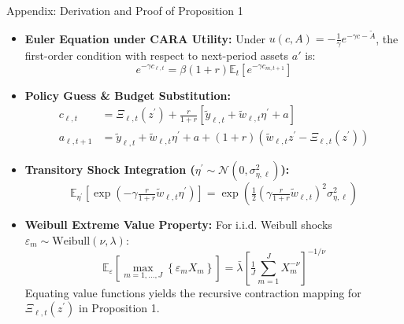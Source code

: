 \documentclass[aspectratio=169, 10pt]{beamer}
\begin{document}
\begin{frame}{Appendix: Derivation and Proof of Proposition 1 \hfill \hyperlink{main:prop1}{\scriptsize{}}}\label{backup:prop1_proof}
    \begin{itemize}\small\setlength{\itemsep}{2pt}
        \item \textbf{Euler Equation under CARA Utility:}
        Under $u(c, A) = -\frac{1}{\gamma}e^{-\gamma c - \tilde{A}}$, the first-order condition with respect to next-period assets $a'$ is:
        {\small
        $$e^{-\gamma c_{\ell,t}} = \beta (1+r) \mathbb{E}_t \left[ e^{-\gamma c_{m,t+1}} \right]$$
        }
        \item \textbf{Policy Guess \& Budget Substitution:}
        {\scriptsize
        \begin{align*}
        c_{\ell,t} &= \Xi_{\ell,t}(z^\prime) + \tfrac{r}{1+r}\left[\tilde{y}_{\ell,t} + \tilde{w}_{\ell,t}\eta^\prime + a\right] \\
        a_{\ell,t+1} &= \tilde{y}_{\ell,t} + \tilde{w}_{\ell,t}\eta^\prime + a + (1+r)(\tilde{w}_{\ell,t}z^\prime - \Xi_{\ell,t}(z^\prime))
        \end{align*}
        }
        \item \textbf{Transitory Shock Integration ($\eta^\prime \sim \mathcal{N}(0, \sigma_{\eta,\ell}^2)$):}
        {\small
        $$\mathbb{E}_{\eta^\prime} \left[ \exp\left(-\gamma \tfrac{r}{1+r} \tilde{w}_{\ell,t}\eta^\prime\right) \right] = \exp\left( \tfrac{1}{2}\left(\gamma \tfrac{r}{1+r}\tilde{w}_{\ell,t}\right)^2 \sigma_{\eta,\ell}^2 \right)$$
        }
        \item \textbf{Weibull Extreme Value Property:} For i.i.d. Weibull shocks $\varepsilon_m \sim \text{Weibull}(\nu, \lambda)$:
        {\small
        $$\mathbb{E}_\varepsilon \left[ \max_{m=1,\dots,J} \left\{ \varepsilon_m X_m \right\} \right] = \bar{\lambda} \left[ \tfrac{1}{J} \sum_{m=1}^J X_m^{-\nu} \right]^{-1/\nu}$$
        }
        Equating value functions yields the recursive contraction mapping for $\Xi_{\ell,t}(z^\prime)$ in Proposition 1.
    \end{itemize}
\end{frame}
\end{document}
